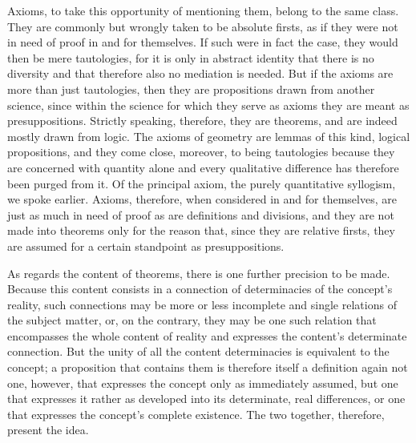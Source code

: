 Axioms, to take this opportunity of mentioning them,
belong to the same class.
They are commonly but wrongly taken to be absolute firsts,
as if they were not in need of proof
in and for themselves.
If such were in fact the case,
they would then be mere tautologies,
for it is only in abstract identity
that there is no diversity
and that therefore also no mediation is needed.
But if the axioms are more than just tautologies,
then they are propositions drawn from another science,
since within the science for which they serve
as axioms they are meant as presuppositions.
Strictly speaking, therefore, they are theorems,
and are indeed mostly drawn from logic.
The axioms of geometry are lemmas of this kind,
logical propositions,
and they come close, moreover, to being tautologies
because they are concerned with quantity alone
and every qualitative difference has
therefore been purged from it.
Of the principal axiom, the purely quantitative syllogism,
we spoke earlier.
Axioms, therefore, when considered in and for themselves,
are just as much in need of proof
as are definitions and divisions,
and they are not made into theorems
only for the reason that,
since they are relative firsts,
they are assumed for a certain standpoint
as presuppositions.

As regards the content of theorems,
there is one further precision to be made.
Because this content consists in a connection of
determinacies of the concept's reality,
such connections may be more or less incomplete
and single relations of the subject matter, or,
on the contrary, they may be one such relation
that encompasses the whole content of reality
and expresses the content's determinate connection.
But the unity of all the content determinacies is
equivalent to the concept;
a proposition that contains them is
therefore itself a definition again not one, however,
that expresses the concept only as immediately assumed,
but one that expresses it rather
as developed into its determinate, real differences,
or one that expresses the concept's complete existence.
The two together, therefore, present the idea.

